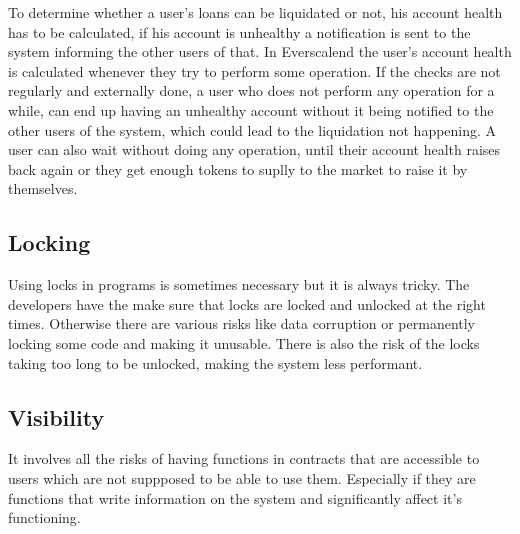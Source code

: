 To determine whether a user's loans can be liquidated or not, his account health has to be calculated, if his account is unhealthy a notification is sent to the system informing the other users of that. In Everscalend the user's account health is calculated whenever they try to perform some operation. If the checks are not regularly and externally done, a user who does not perform any operation for a while, can end up having an unhealthy account without it being notified to the other users of the system, which could lead to the liquidation not happening. A user can also wait without doing any operation, until their account health raises back again or they get enough tokens to suplly to the market to raise it by themselves.

\subsection{Locking}

Using locks in programs is sometimes necessary but it is always tricky. The developers have the make sure that locks are locked and unlocked at the right times. Otherwise there are various risks like data corruption or permanently locking some code and making it unusable. There is also the risk of the locks taking too long to be unlocked, making the system less performant.

\subsection{Visibility}

It involves all the risks of having functions in contracts that are accessible to users which are not suppposed to be able to use them. Especially if they are functions that write information on the system and significantly affect it's functioning.
